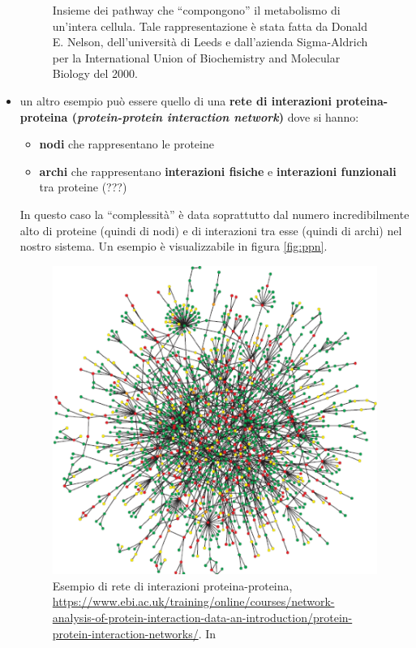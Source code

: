 \documentclass[a4paper,12pt, oneside]{book}
\begin{document}
\begin{itemize}
\begin{figure}
    \caption{Insieme dei pathway che ``compongono'' il metabolismo di un'intera
      cellula. Tale rappresentazione è stata fatta da Donald E. Nelson,
      dell'università di Leeds e dall'azienda Sigma-Aldrich per la International
      Union of Biochemistry and Molecular Biology del 2000.}
    \label{fig:meta}
  \end{figure}
  \item un altro esempio può essere quello di una \textbf{rete di interazioni
    proteina-proteina (\textit{protein-protein interaction network})} dove si
  hanno:  
  \begin{itemize}
    \item \textbf{nodi} che rappresentano le proteine
    \item \textbf{archi} che rappresentano \textbf{interazioni fisiche} e
    \textbf{interazioni funzionali} tra proteine (???)
  \end{itemize}
  In questo caso la ``complessità'' è data soprattutto dal numero
  incredibilmente alto di proteine (quindi di nodi) e di interazioni tra esse
  (quindi di archi) nel nostro sistema. Un esempio è visualizzabile in figura
  \ref{fig:ppn}. 
  \begin{figure}
    \centering
     \includegraphics[width = \textwidth]{img/ppn.png}
    \caption{Esempio di rete di interazioni
      proteina-proteina,
      \url{https://www.ebi.ac.uk/training/online/courses/network-analysis-of-protein-interaction-data-an-introduction/protein-protein-interaction-networks/}. In
}
\end{figure}
\end{itemize}
\end{document}
